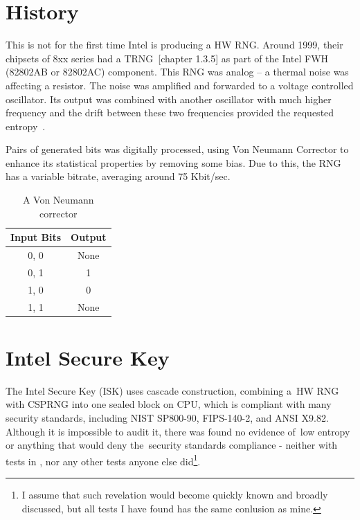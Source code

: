 \section{History}\label{sec:intel-history}
\par{
This is not for the first time Intel is producing a HW RNG. Around 1999, 
their chipsets of 8xx series had a TRNG~\cite{Intel810Manual}[chapter 1.3.5]\cite{RNGTools} 
as part of the Intel FWH (82802AB or 82802AC) component.
This RNG was analog -- a thermal noise was affecting a resistor. 
The noise was amplified and forwarded to a voltage controlled oscillator. 
Its output was combined with another oscillator with much higher frequency 
and the drift between these two frequencies provided the requested entropy~\cite{IntelRNGAnalysis}.
}
\par{
Pairs of generated bits was digitally processed, using Von Neumann Corrector to enhance its statistical properties by removing some bias. Due to this, the RNG has a variable bitrate, averaging around 75 Kbit/sec.
}
\begin{table}[h!]
  \begin{center}
    \begin{tabular}{|c|c|}
      \hline
      Input Bits &  Output\\
      \hline  
      0, 0 & None\\
      0, 1 & 1\\
      1, 0 & 0\\
      1, 1 & None\\
      \hline
    \end{tabular}    \caption{A Von Neumann corrector}
    \label{fig:VonNeumannCorrector}
  \end{center}
\end{table}
\section{Intel Secure Key}\label{sec:intel-secure-key}
\par{
The Intel Secure Key (ISK) uses cascade construction, combining a~HW RNG
 with CSPRNG into one sealed block on CPU, which is compliant with many 
 security standards, including NIST SP800-90, FIPS-140-2, and ANSI 
X9.82\cite{IntelDRNGGuide}. Although it is impossible to audit it, there was found 
 no evidence of~low entropy or anything that would deny the~security standards 
 compliance - neither with tests in , nor any other 
 tests anyone else did\footnote{I assume that such revelation would become 
 quickly known and broadly discussed, but all tests I have found has 
 the same conlusion as mine.}.
 }

